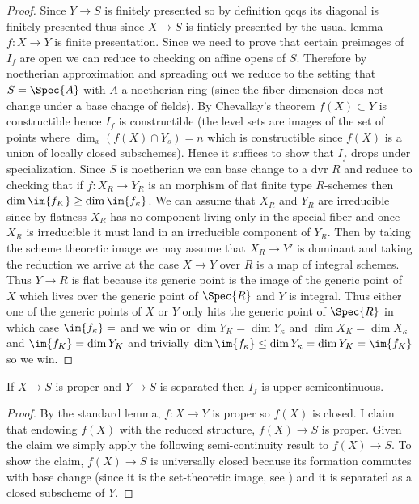 \documentclass[12pt]{article}
\begin{document}
\begin{proof}
Since $Y \to S$ is finitely presented so by definition qcqs its diagonal is finitely presented thus since $X \to S$ is fintiely presented by the usual lemma $f : X \to Y$ is finite presentation. Since we need to prove that certain preimages of $I_f$ are open we can reduce to checking on affine opens of $S$. Therefore by noetherian approximation and spreading out we reduce to the setting that $S = \Spec{A}$ with $A$ a noetherian ring (since the fiber dimension does not change under a base change of fields). By Chevallay's theorem $f(X) \subset Y$ is constructible hence $I_f$ is constructible (the level sets are images of the set of points where $\dim_x (f(X) \cap Y_s) = n$ which is constructible since $f(X)$ is a union of locally closed subschemes). Hence it suffices to show that $I_f$ drops under specialization. Since $S$ is noetherian we can base change to a dvr $R$ and reduce to checking that if $f : X_R \to Y_R$ is an morphism of flat finite type $R$-schemes then $\dim{\im{f_K}} \ge \dim{\im{f_\kappa}}$. We can assume that $X_R$ and $Y_R$ are irreducible since by flatness $X_R$ has no component living only in the special fiber and once $X_R$ is irreducible it must land in an irreducible component of $Y_R$. Then by taking the scheme theoretic image we may assume that $X_R \to Y'$ is dominant and taking the reduction we arrive at the case $X \to Y$ over $R$ is a map of integral schemes. Thus $Y \to R$ is flat because its generic point is the image of the generic point of $X$ which lives over the generic point of $\Spec{R}$ and $Y$ is integral. Thus either one of the generic points of $X$ or $Y$ only hits the generic point of $\Spec{R}$ in which case $\im{f_\kappa} = \empty$ and we win or $\dim{Y_K} = \dim{Y_\kappa}$ and $\dim{X_K} = \dim{X_\kappa}$ and $\im{f_K} = \dim{Y_K}$ and trivially $\dim{\im{f_\kappa}} \le \dim{Y_\kappa} = \dim{Y_K} = \im{f_K}$ so we win. 
\end{proof}

\begin{prop}
If $X \to S$ is proper and $Y \to S$ is separated then $I_f$ is upper semicontinuous.
\end{prop}

\begin{proof}
By the standard lemma, $f : X \to Y$ is proper so $f(X)$ is closed. I claim that endowing $f(X)$ with the reduced structure, $f(X) \to S$ is proper. Given the claim we simply apply the following semi-continuity result to $f(X) \to S$. To show the claim, $f(X) \to S$ is universally closed because its formation commutes with base change (since it is the set-theoretic image, see ) and it is separated as a closed subscheme of $Y$. 
\end{proof}
\end{document}
